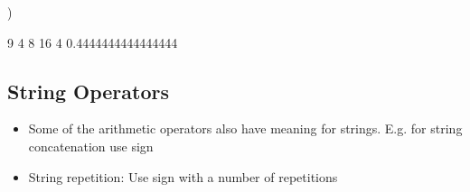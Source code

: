 \documentclass[letterpaper,10pt,english]{sphinxmanual}
\begin{document}
\begin{sphinxVerbatim}[commandchars=\\\{\}]
    

    



)

\end{sphinxVerbatim}

\begin{sphinxVerbatim}[commandchars=\\\{\}]
9
4
8
16
4
0.4444444444444444
\end{sphinxVerbatim}


\subsection{String Operators}
\label{\detokenize{content/Introduction_to_Programming:string-operators}}\begin{itemize}
\item {} 
Some of the arithmetic operators also have meaning for strings. E.g. for string concatenation use \sphinxcode{\sphinxupquote{+}} sign

\item {} 
String repetition: Use \sphinxcode{\sphinxupquote{*}} sign with a number of repetitions

\end{itemize}

\begin{sphinxVerbatim}[commandchars=\\\{\}]
  
  
  

\end{sphinxVerbatim}
\end{document}

